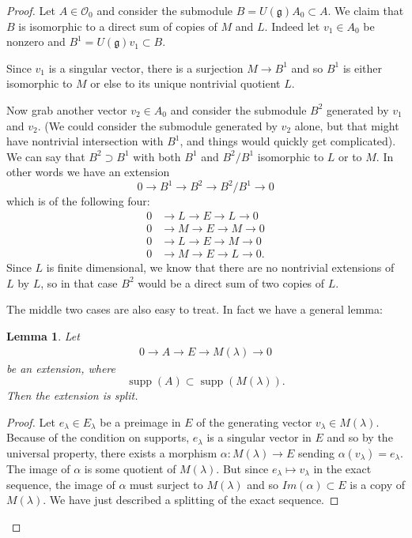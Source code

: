 \documentclass[12pt]{article}
\theoremstyle{plain}
\newtheorem{lemma}[thm]{Lemma}
\theoremstyle{definition}
\numberwithin{equation}{section}
\DeclareMathOperator{\supp}{supp}
\newcommand{\al}{\alpha}
\newcommand{\la}{\lambda}
\newcommand{\g}{\mathfrak{g}}
\newcommand{\OO}{\mathcal{O}}
\begin{document}
\begin{proof}
Let $A \in \OO_0$ and consider the submodule $B = U(\g)A_0 \subset A$. We claim that $B$ is isomorphic to a direct sum of copies of $M$ and $L$. Indeed let $v_1 \in A_0$ be nonzero and $B^1 = U(\g)v_1 \subset B$.

Since $v_1$ is a singular vector, there is a surjection $M \rightarrow B^1$ and so $B^1$ is either isomorphic to $M$ or else to its unique nontrivial quotient $L$.

Now grab another vector $v_2 \in A_0$ and consider the submodule $B^2$ generated by $v_1$ and $v_2$. (We could consider the submodule generated by $v_2$ alone, but that might have nontrivial intersection with $B^1$, and things would quickly get complicated). We can say that $B^2 \supset B^1$ with both $B^1$ and $B^2 / B^1$ isomorphic to $L$ or to $M$. In other words we have an extension
\[
0 \rightarrow B^1 \rightarrow B^2 \rightarrow B^2/B^1 \rightarrow 0
\]
which is of the following four:
\begin{align*}
0 &\rightarrow L \rightarrow E \rightarrow L \rightarrow 0 \\
%
0 &\rightarrow M \rightarrow E \rightarrow M \rightarrow 0 \\
%
0 &\rightarrow L \rightarrow E \rightarrow M \rightarrow 0 \\
%
0 &\rightarrow M \rightarrow E \rightarrow L \rightarrow 0.
\end{align*}
Since $L$ is finite dimensional, we know that there are no nontrivial extensions of $L$ by $L$, so in that case $B^2$ would be a direct sum of two copies of $L$.

The middle two cases are also easy to treat. In fact we have a general lemma:
\begin{lemma}
Let
\begin{align*}
0 \rightarrow A \rightarrow E \rightarrow M(\lambda) \rightarrow 0
\end{align*}
be an extension, where
\[
\supp(A) \subset \supp(M(\la)).
\]
Then the extension is split.
\end{lemma}

\begin{proof}
Let $e_\la \in E_\la$ be a preimage in $E$ of the generating vector $v_\la \in M(\la)$. Because of the condition on supports, $e_\la$ is a singular vector in $E$ and so by the universal property, there exists a morphism $\al : M(\la) \rightarrow E$ sending $\al(v_\la) = e_\la$. The image of $\al$ is some quotient of $M(\la)$. But since $e_\la \mapsto v_\la$ in the exact sequence, the image of $\al$ must surject to $M(\la)$ and so $Im(\al) \subset E$ is a copy of $M(\la)$. We have just described a splitting of the exact sequence.
\end{proof}


\end{proof}
\end{document}
